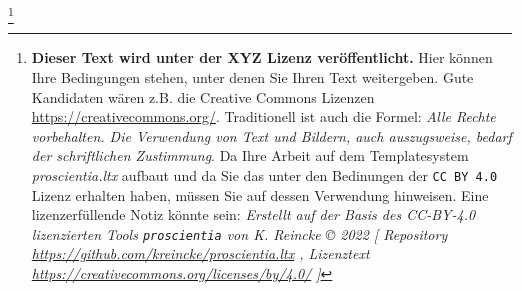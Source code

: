 
\footnote{\textbf{Dieser Text wird unter der XYZ Lizenz veröffentlicht.}
Hier können Ihre Bedingungen stehen, unter denen Sie Ihren Text weitergeben.
Gute Kandidaten wären z.B. die Creative Commons Lizenzen
\href{https://creativecommons.org/}{https://creativecommons.org/}. Traditionell ist auch die Formel: \emph{Alle Rechte vorbehalten. Die Verwendung von Text und Bildern, auch auszugsweise, bedarf der schriftlichen Zustimmung}. \newline
Da Ihre Arbeit auf dem Templatesystem \textit{proscientia.ltx} aufbaut und da Sie das unter den Bedinungen der \texttt{CC BY 4.0} Lizenz erhalten haben, müssen Sie auf dessen Verwendung hinweisen. Eine lizenzerfüllende Notiz könnte sein:
\newline
\textit{Erstellt auf der Basis des CC-BY-4.0 lizenzierten Tools \texttt{proscientia} von K. Reincke \copyright{} 2022 [
Repository \href{https://github.com/kreincke/proscientia.ltx}{https://github.com/kreincke/proscientia.ltx} ,
Lizenztext \href{https://creativecommons.org/licenses/by/4.0/}{https://creativecommons.org/licenses/by/4.0/} ]
}}
